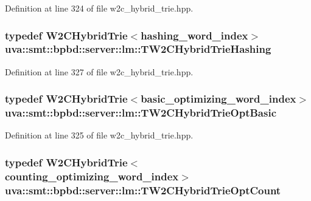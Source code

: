 Definition at line 324 of file w2c\+\_\+hybrid\+\_\+trie.\+hpp.

\hypertarget{namespaceuva_1_1smt_1_1bpbd_1_1server_1_1lm_aa2818fd447c1e13a07ae1c4e43bac187}{}
\subsubsection[{T\+W2\+C\+Hybrid\+Trie\+Hashing}]{\setlength{\rightskip}{0pt plus 5cm}typedef {\bf W2\+C\+Hybrid\+Trie}$<${\bf hashing\+\_\+word\+\_\+index}$>$ {\bf uva\+::smt\+::bpbd\+::server\+::lm\+::\+T\+W2\+C\+Hybrid\+Trie\+Hashing}}\label{namespaceuva_1_1smt_1_1bpbd_1_1server_1_1lm_aa2818fd447c1e13a07ae1c4e43bac187}


Definition at line 327 of file w2c\+\_\+hybrid\+\_\+trie.\+hpp.

\hypertarget{namespaceuva_1_1smt_1_1bpbd_1_1server_1_1lm_a092da1a25cd6887e951a66d3f4983b51}{}
\subsubsection[{T\+W2\+C\+Hybrid\+Trie\+Opt\+Basic}]{\setlength{\rightskip}{0pt plus 5cm}typedef {\bf W2\+C\+Hybrid\+Trie}$<${\bf basic\+\_\+optimizing\+\_\+word\+\_\+index}$>$ {\bf uva\+::smt\+::bpbd\+::server\+::lm\+::\+T\+W2\+C\+Hybrid\+Trie\+Opt\+Basic}}\label{namespaceuva_1_1smt_1_1bpbd_1_1server_1_1lm_a092da1a25cd6887e951a66d3f4983b51}


Definition at line 325 of file w2c\+\_\+hybrid\+\_\+trie.\+hpp.

\hypertarget{namespaceuva_1_1smt_1_1bpbd_1_1server_1_1lm_a5f23b61f755456ea49e9ec0eed15eb93}{}
\subsubsection[{T\+W2\+C\+Hybrid\+Trie\+Opt\+Count}]{\setlength{\rightskip}{0pt plus 5cm}typedef {\bf W2\+C\+Hybrid\+Trie}$<${\bf counting\+\_\+optimizing\+\_\+word\+\_\+index}$>$ {\bf uva\+::smt\+::bpbd\+::server\+::lm\+::\+T\+W2\+C\+Hybrid\+Trie\+Opt\+Count}}\label{namespaceuva_1_1smt_1_1bpbd_1_1server_1_1lm_a5f23b61f755456ea49e9ec0eed15eb93}


